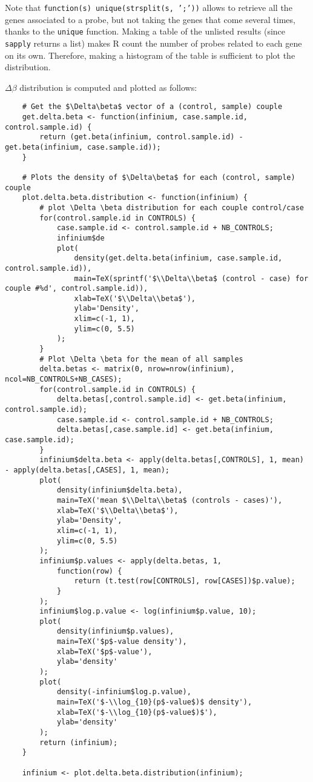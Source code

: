 \documentclass{article}
\begin{document}
Note that \texttt{function(s) {unique(strsplit(s, ';'))}} allows to retrieve all the genes associated to a probe, but not taking
the genes that come several times, thanks to the \texttt{unique} function. Making a table of the unlisted results (since
\texttt{sapply} returns a list) makes R count the number of probes related to each gene on its own. Therefore, making a histogram
of the table is sufficient to plot the distribution.

$\Delta\beta$ distribution is computed and plotted as follows:
\begin{lstlisting}
	# Get the $\Delta\beta$ vector of a (control, sample) couple
	get.delta.beta <- function(infinium, case.sample.id, control.sample.id) {
		return (get.beta(infinium, control.sample.id) - get.beta(infinium, case.sample.id));
	}

	# Plots the density of $\Delta\beta$ for each (control, sample) couple
	plot.delta.beta.distribution <- function(infinium) {
		# plot \Delta \beta distribution for each couple control/case
		for(control.sample.id in CONTROLS) {
			case.sample.id <- control.sample.id + NB_CONTROLS;
			infinium$de
			plot(
				density(get.delta.beta(infinium, case.sample.id, control.sample.id)),
				main=TeX(sprintf('$\\Delta\\beta$ (control - case) for couple #%d', control.sample.id)),
				xlab=TeX('$\\Delta\\beta$'),
				ylab='Density',
				xlim=c(-1, 1),
				ylim=c(0, 5.5)
			);
		}
		# Plot \Delta \beta for the mean of all samples
		delta.betas <- matrix(0, nrow=nrow(infinium), ncol=NB_CONTROLS+NB_CASES);
		for(control.sample.id in CONTROLS) {
			delta.betas[,control.sample.id] <- get.beta(infinium, control.sample.id);
			case.sample.id <- control.sample.id + NB_CONTROLS;
			delta.betas[,case.sample.id] <- get.beta(infinium, case.sample.id);
		}
		infinium$delta.beta <- apply(delta.betas[,CONTROLS], 1, mean) - apply(delta.betas[,CASES], 1, mean);
		plot(
			density(infinium$delta.beta),
			main=TeX('mean $\\Delta\\beta$ (controls - cases)'),
			xlab=TeX('$\\Delta\\beta$'),
			ylab='Density',
			xlim=c(-1, 1),
			ylim=c(0, 5.5)
		);
		infinium$p.values <- apply(delta.betas, 1,
			function(row) {
				return (t.test(row[CONTROLS], row[CASES])$p.value);
			}
		);
		infinium$log.p.value <- log(infinium$p.value, 10);
		plot(
			density(infinium$p.values),
			main=TeX('$p$-value density'),
			xlab=TeX('$p$-value'),
			ylab='density'
		);
		plot(
			density(-infinium$log.p.value),
			main=TeX('$-\\log_{10}(p$-value$)$ density'),
			xlab=TeX('$-\\log_{10}(p$-value$)$'),
			ylab='density'
		);
		return (infinium);
	}

	infinium <- plot.delta.beta.distribution(infinium);
\end{lstlisting}
\end{document}
